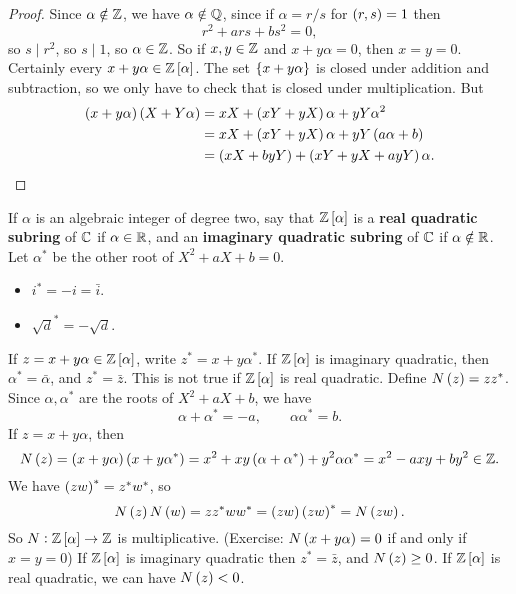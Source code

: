 \begin{proof}
Since $ \alpha \notin \mathbb{Z} $, we have $ \alpha \notin \mathbb{Q} $, since if $ \alpha = r / s $ for $ \br{r, s} = 1 $ then
$$ r^2 + ars + bs^2 = 0, $$
so $ s \mid r^2 $, so $ s \mid 1 $, so $ \alpha \in \mathbb{Z} $. So if $ x, y \in \mathbb{Z} $ and $ x + y\alpha = 0 $, then $ x = y = 0 $. Certainly every $ x + y\alpha \in \Z\sbr{\alpha} $. The set $ \cbr{x + y\alpha} $ is closed under addition and subtraction, so we only have to check that is closed under multiplication. But
\begin{align*}
\br{x + y\alpha}\br{X + Y\alpha}
& = xX + \br{xY + yX}\alpha + yY\alpha^2 \\
& = xX + \br{xY + yX}\alpha + yY\br{a\alpha + b} \\
& = \br{xX + byY} + \br{xY + yX + ayY}\alpha.
\end{align*}
\end{proof}

If $ \alpha $ is an algebraic integer of degree two, say that $ \Z\sbr{\alpha} $ is a \textbf{real quadratic subring} of $ \mathbb{C} $ if $ \alpha \in \mathbb{R} $, and an \textbf{imaginary quadratic subring} of $ \mathbb{C} $ if $ \alpha \notin \mathbb{R} $. Let $ \alpha^* $ be the other root of $ X^2 + aX + b = 0 $.

\begin{example*}
\hfill
\begin{itemize}
\item $ i^* = -i = \bar{i} $.
\item $ \sqrt{d}^* = -\sqrt{d} $.
\end{itemize}
\end{example*}

If $ z = x + y\alpha \in \Z\sbr{\alpha} $, write $ z^* = x + y\alpha^* $. If $ \Z\sbr{\alpha} $ is imaginary quadratic, then $ \alpha^* = \bar{\alpha} $, and $ z^* = \bar{z} $. This is not true if $ \Z\sbr{\alpha} $ is real quadratic. Define $ N\br{z} = zz^* $. Since $ \alpha, \alpha^* $ are the roots of $ X^2 + aX + b $, we have
$$ \alpha + \alpha^* = -a, \qquad \alpha\alpha^* = b. $$
If $ z = x + y\alpha $, then
$$ N\br{z} = \br{x + y\alpha}\br{x + y\alpha^*} = x^2 + xy\br{\alpha + \alpha^*} + y^2\alpha\alpha^* = x^2 - axy + by^2 \in \Z. $$
We have $ \br{zw}^* = z^*w^* $, so
$$ N\br{z}N\br{w} = zz^*ww^* = \br{zw}\br{zw}^* = N\br{zw}. $$
So $ N : \Z\sbr{\alpha} \to \Z $ is multiplicative. (Exercise: $ N\br{x + y\alpha} = 0 $ if and only if $ x = y = 0 $) If $ \Z\sbr{\alpha} $ is imaginary quadratic then $ z^* = \bar{z} $, and $ N\br{z} \ge 0 $. If $ \Z\sbr{\alpha} $ is real quadratic, we can have $ N\br{z} < 0 $.

